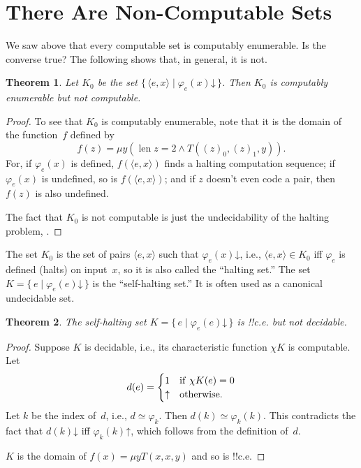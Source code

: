 \documentclass[10pt,a4paper]{article}
\makeatletter
\theoremstyle{plain}
\newtheorem{thm}{Theorem}[section]
\theoremstyle{definition}
\theoremstyle{remark}
\newcommand*{\olfileid}[3]{}
\newcommand*{\olsection}[1]{\section*{#1}}
\newcommand*{\ollabel}[1]{\label{#1}}
\newcommand{\olref}{\@ifnextchar[{\olref@i}{\olref@final}}
\def\olref@i[#1]{\@ifnextchar[{\olref@ii}{\olref@final}}
\def\olref@ii[#1]{\@ifnextchar[{\olref@iii}{\olref@final}}
\def\olref@iii[#1]{\olref@final}
\def\olref@final#1{\ref{#1}}
\providecommand{\tuple}[1]{\langle #1 \rangle}
\providecommand{\cfind}[1]{\varphi_{#1}}
\providecommand{\fdefined}{\mathord{\downarrow}}
\providecommand{\len}{\operatorname{len}}
\providecommand{\Setabs}[2]{\{\, #1 \mid #2 \,\}}
\providecommand{\Char}{\chi}
\providecommand{\umin}{\mu}
\providecommand{\fundefined}{\mathord{\uparrow}}
\makeatother
\begin{document}
\olfileid{cmp}{thy}{ncp}
\olsection{There Are Non-Computable Sets}


We saw above that every computable set is computably enumerable. Is
the converse true? The following shows that, in general, it is not.

\begin{thm}\ollabel{thm:K-0}
Let $K_0$ be the set $\Setabs{\tuple{e, x}}{\cfind{e}(x) \fdefined}$.
Then $K_0$ is computably enumerable but not computable.
\end{thm}

\begin{proof}
To see that $K_0$ is computably enumerable, note that it is the
domain of the function~$f$ defined by
\[
f(z) = \umin{y}{(\len{z} = 2 \land T((z)_0, (z)_1, y))}.
\]
For, if $\cfind{e}(x)$ is defined, $f(\tuple{e, x})$ finds a halting
computation sequence; if $\cfind{e}(x)$ is undefined, so is
$f(\tuple{e, x})$; and if $z$ doesn't even code a pair, then $f(z)$ is
also undefined.

The fact that $K_0$ is not computable is just the undecidability of
the halting problem, \olref[hlt]{thm:halting-problem}.
\end{proof}

The set $K_0$ is the set of pairs $\tuple{e,x}$ such that
$\cfind{e}(x) \fdefined$, i.e., $\tuple{e,x} \in K_0$ iff $\cfind{e}$
is defined (halts) on input~$x$, so it is also called the ``halting
set.'' The set $K = \Setabs{e}{\cfind{e}(e) \fdefined}$ is the
``self-halting set.'' It is often used as a canonical undecidable set.

\begin{thm}\ollabel{thm:K}
The self-halting set $K = \Setabs{e}{\cfind{e}(e) \fdefined}$ is
!!{c.e.} but not decidable.
\end{thm}

\begin{proof}
  Suppose $K$ is decidable, i.e., its characteristic function
  $\Char{K}$ is computable. Let 
  \[d(e) = \begin{cases}
  1 & \text{if\/ $\Char{K}(e) = 0$}\\
  \fundefined & \text{otherwise.}
  \end{cases}
  \] 
  Let $k$ be the index of~$d$, i.e., $d \simeq \cfind{k}$. Then $d(k)
  \simeq \cfind{k}(k)$. This contradicts the fact that $d(k)
  \fdefined$ iff $\cfind{k}(k) \fundefined$, which follows from the
  definition of~$d$.

  $K$ is the domain of $f(x) = \umin{y}{T(x,x,y)}$ and so is !!{c.e.}
\end{proof}
\end{document}
